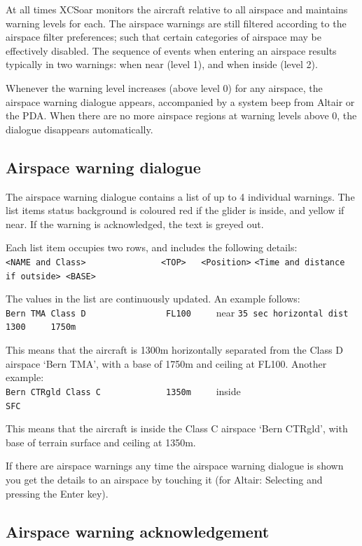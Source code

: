 At all times XCSoar monitors the aircraft relative to all airspace and
maintains warning levels for each.  The airspace warnings are still
filtered according to the airspace filter preferences; such that
certain categories of airspace may be effectively disabled.
The sequence of events when entering an airspace results typically
in two warnings: when near (level 1), and when inside (level 2).

Whenever the warning level increases (above level 0) for any airspace,
the airspace warning dialogue appears, accompanied by a system beep from
Altair or the PDA.  When there are no more airspace regions at warning
levels above 0, the dialogue disappears automatically.

\subsection*{Airspace warning dialogue}

The airspace warning dialogue contains a list of up to 4 individual
warnings.  The list items status background is coloured red if the glider is
inside, and yellow if near.  If the warning is acknowledged, the
text is greyed out.

Each list item occupies two rows, and includes the following details:\\
\verb+<NAME and Class>               <TOP>   <Position>+
\verb+<Time and distance if outside> <BASE>+

The values in the list are continuously updated.
An example follows:\\
\verb+Bern TMA Class D                FL100     +\colorbox{AirspaceYellow}{near}
\verb+35 sec horizontal dist 1300     1750m+

This means that the aircraft is 1300m horizontally separated from the Class D airspace
`Bern TMA', with a base of 1750m and ceiling at FL100.
Another example:\\
\verb+Bern CTRgld Class C             1350m     +\colorbox{AirspaceRed}{inside}
\verb+                                SFC+

This means that the aircraft is inside the Class C airspace `Bern
CTRgld', with base of terrain surface and ceiling at 1350m.

If there are airspace warnings any time the airspace warning dialogue is shown
you get the details to an airspace by touching it (for Altair: Selecting and
pressing the Enter key).

\subsection*{Airspace warning acknowledgement}

